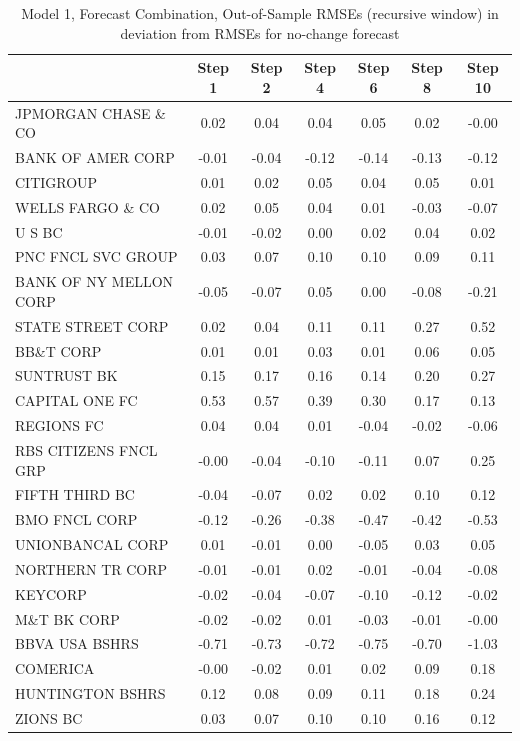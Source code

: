 \documentclass[11pt]{article}
\begin{document}
\begin{table}                                               
\caption{Model 1, Forecast Combination, Out-of-Sample RMSEs (recursive window) in deviation from RMSEs for no-change forecast}
\center                                                     
\begin{tabular}{|l|c|c|c|c|c|c|}                            
\hline                                                      
&Step 1 &Step 2 &Step 4 &Step 6 &Step 8 &Step 10\\          
\hline                                                      
JPMORGAN CHASE \& CO  &0.02&0.04&0.04&0.05&0.02&-0.00\\     
BANK OF AMER CORP     &-0.01&-0.04&-0.12&-0.14&-0.13&-0.12\\
CITIGROUP             &0.01&0.02&0.05&0.04&0.05&0.01\\      
WELLS FARGO \& CO     &0.02&0.05&0.04&0.01&-0.03&-0.07\\    
U S BC                &-0.01&-0.02&0.00&0.02&0.04&0.02\\    
PNC FNCL SVC GROUP    &0.03&0.07&0.10&0.10&0.09&0.11\\      
BANK OF NY MELLON CORP&-0.05&-0.07&0.05&0.00&-0.08&-0.21\\  
STATE STREET CORP     &0.02&0.04&0.11&0.11&0.27&0.52\\      
BB\&T CORP            &0.01&0.01&0.03&0.01&0.06&0.05\\      
SUNTRUST BK           &0.15&0.17&0.16&0.14&0.20&0.27\\      
CAPITAL ONE FC        &0.53&0.57&0.39&0.30&0.17&0.13\\      
REGIONS FC            &0.04&0.04&0.01&-0.04&-0.02&-0.06\\   
RBS CITIZENS FNCL GRP &-0.00&-0.04&-0.10&-0.11&0.07&0.25\\  
FIFTH THIRD BC        &-0.04&-0.07&0.02&0.02&0.10&0.12\\    
BMO FNCL CORP         &-0.12&-0.26&-0.38&-0.47&-0.42&-0.53\\
UNIONBANCAL CORP      &0.01&-0.01&0.00&-0.05&0.03&0.05\\    
NORTHERN TR CORP      &-0.01&-0.01&0.02&-0.01&-0.04&-0.08\\ 
KEYCORP               &-0.02&-0.04&-0.07&-0.10&-0.12&-0.02\\
M\&T BK CORP          &-0.02&-0.02&0.01&-0.03&-0.01&-0.00\\ 
BBVA USA BSHRS        &-0.71&-0.73&-0.72&-0.75&-0.70&-1.03\\
COMERICA              &-0.00&-0.02&0.01&0.02&0.09&0.18\\    
HUNTINGTON BSHRS      &0.12&0.08&0.09&0.11&0.18&0.24\\      
ZIONS BC              &0.03&0.07&0.10&0.10&0.16&0.12\\      
\hline                                                      
\end{tabular}                                               
\end{table}                                                 
\end{document}
